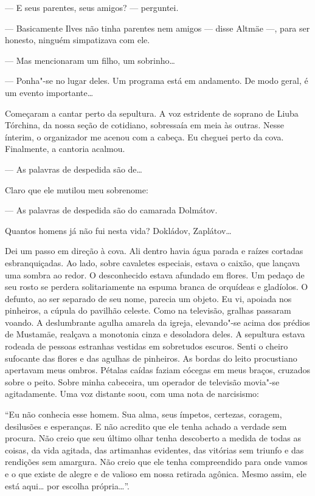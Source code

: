 --- E seus parentes, seus amigos? --- perguntei.

--- Basicamente Ilves não tinha parentes nem amigos --- disse Altmäe
---, para ser honesto, ninguém simpatizava com ele.

--- Mas mencionaram um filho, um sobrinho\ldots{}

--- Ponha"-se no lugar deles. Um programa está em andamento. De modo
geral, é um evento importante\ldots{}

\bigskip

Começaram a cantar perto da sepultura. A voz estridente de soprano de
Liuba Tórchina, da nossa seção de cotidiano, sobressaía em meia às
outras. Nesse ínterim, o organizador me acenou com a cabeça. Eu cheguei
perto da cova. Finalmente, a cantoria acalmou.

--- As palavras de despedida são de\ldots{} \label{ref9}

Claro que ele mutilou meu sobrenome:

--- As palavras de despedida são do camarada Dolmátov.

Quantos homens já não fui nesta vida? Dokládov, Zaplátov\ldots{}

Dei um passo em direção à cova. Ali dentro havia água parada e raízes
cortadas esbranquiçadas. Ao lado, sobre cavaletes especiais, estava o
caixão, que lançava uma sombra ao redor. O desconhecido estava afundado
em flores. Um pedaço de seu rosto se perdera solitariamente na espuma
branca de orquídeas e gladíolos. O defunto, ao ser separado de seu nome,
parecia um objeto. Eu vi, apoiada nos pinheiros, a cúpula do pavilhão celeste.
Como na televisão, gralhas passaram voando. A deslumbrante agulha
amarela da igreja, elevando"-se acima dos prédios de Mustamäe, realçava a
monotonia cinza e desoladora deles. A sepultura estava rodeada de
pessoas estranhas vestidas em sobretudos escuros. Senti o cheiro
sufocante das flores e das agulhas de pinheiros. As bordas do leito
procustiano apertavam meus ombros. Pétalas caídas faziam cócegas em meus
braços, cruzados sobre o peito. Sobre minha cabeceira, um operador de
televisão movia"-se agitadamente. Uma voz distante soou, com uma nota de
narcisismo:

``Eu não conhecia esse homem. Sua alma, seus ímpetos, certezas, coragem,
desilusões e esperanças. E não acredito que ele tenha achado a verdade
sem procura. Não creio que seu último olhar tenha descoberto a medida de
todas as coisas, da vida agitada, das artimanhas evidentes, das vitórias
sem triunfo e das rendições sem amargura. Não creio que ele tenha
compreendido para onde vamos e o que existe de alegre e de valioso em
nossa retirada agônica. Mesmo assim, ele está aqui\ldots{} por escolha
própria\ldots{}''.

